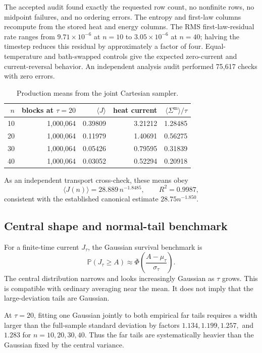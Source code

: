 \documentclass[11pt]{article}
\newcommand{\Prob}{\mathbb P}
\newcommand{\sm}{\Sigma^{\mathrm m}}
\begin{document}
The accepted audit found exactly the requested row count, no nonfinite rows,
no midpoint failures, and no ordering errors.  The entropy and first-law
columns recompute from the stored heat and energy columns.  The RMS
first-law-residual rate ranges from $9.71\times10^{-6}$ at $n=10$ to
$3.05\times10^{-6}$ at $n=40$; halving the timestep reduces this residual by
approximately a factor of four.  Equal-temperature and bath-swapped controls
give the expected zero-current and current-reversal behavior.  An independent
analysis audit performed 75,617 checks with zero errors.

\begin{table}[ht]
\centering
\begin{tabular}{rrrrr}
\toprule
$n$ & blocks at $\tau=20$ & $\langle J\rangle$ & heat current & $\langle\sm\rangle/\tau$\\
\midrule
10 & 1,000,064 & 0.39809 & 3.21212 & 1.28485\\
20 & 1,000,064 & 0.11979 & 1.40691 & 0.56275\\
30 & 1,000,064 & 0.05426 & 0.79595 & 0.31839\\
40 & 1,000,064 & 0.03052 & 0.52294 & 0.20918\\
\bottomrule
\end{tabular}
\caption{Production means from the joint Cartesian sampler.}
\label{tab:means}
\end{table}

As an independent transport cross-check, these means obey
\begin{equation}
 \langle J(n)\rangle=28.889\,n^{-1.8485},\qquad R^2=0.9987,
\end{equation}
consistent with the established canonical estimate
$28.75n^{-1.850}$.

\subsection{Central shape and normal-tail benchmark}

For a finite-time current $J_\tau$, the Gaussian survival benchmark is
\begin{equation}
 \Prob(J_\tau\ge A)\approx
 \overline\Phi\!\left(\frac{A-\mu_\tau}{\sigma_\tau}\right).
\end{equation}
The central distribution narrows and looks increasingly Gaussian as $\tau$
grows.  This is compatible with ordinary averaging near the mean.  It does
not imply that the large-deviation tails are Gaussian.

At $\tau=20$, fitting one Gaussian jointly to both empirical far tails requires
a width larger than the full-sample standard deviation by factors
$1.134,1.199,1.257,$ and $1.283$ for $n=10,20,30,40$.  Thus the far tails are
systematically heavier than the Gaussian fixed by the central variance.
\end{document}
